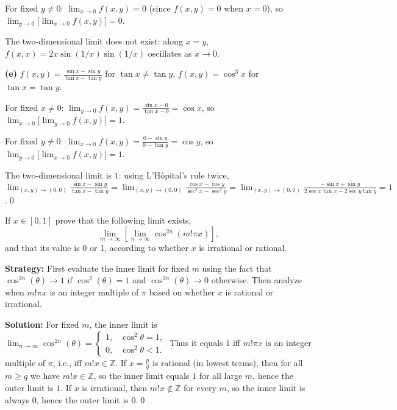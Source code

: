 For fixed $y\neq0$: $\lim_{x\to0}f(x,y)=0$ (since $f(x,y)=0$ when $x=0$), so $\lim_{y\to0}\big[\lim_{x\to0}f(x,y)\big]=0$.

The two-dimensional limit does not exist: along $x=y$, $f(x,x)=2x\sin(1/x)\sin(1/x)$ oscillates as $x\to0$.

\noindent\textbf{(e)} $f(x,y)=\frac{\sin x-\sin y}{\tan x-\tan y}$ for $\tan x\neq\tan y$, $f(x,y)=\cos^3x$ for $\tan x=\tan y$.

For fixed $x\neq0$: $\lim_{y\to0}f(x,y)=\frac{\sin x-0}{\tan x-0}=\cos x$, so $\lim_{x\to0}\big[\lim_{y\to0}f(x,y)\big]=1$.

For fixed $y\neq0$: $\lim_{x\to0}f(x,y)=\frac{0-\sin y}{0-\tan y}=\cos y$, so $\lim_{y\to0}\big[\lim_{x\to0}f(x,y)\big]=1$.

The two-dimensional limit is $1$: using L'Hôpital's rule twice, $\lim_{(x,y)\to(0,0)}\frac{\sin x-\sin y}{\tan x-\tan y}=\lim_{(x,y)\to(0,0)}\frac{\cos x-\cos y}{\sec^2x-\sec^2y}=\lim_{(x,y)\to(0,0)}\frac{-\sin x+\sin y}{2\sec x\tan x-2\sec y\tan y}=1$.\qed



\begin{problembox}
If \( x \in [0, 1] \) prove that the following limit exists,
\[\lim_{m \to \infty} \left[ \lim_{n \to \infty} \cos^{2n} (m! \pi x) \right],\]
and that its value is 0 or 1, according to whether \( x \) is irrational or rational.
\end{problembox}

\noindent\textbf{Strategy:} First evaluate the inner limit for fixed $m$ using the fact that $\cos^{2n}(\theta) \to 1$ if $\cos^2(\theta) = 1$ and $\cos^{2n}(\theta) \to 0$ otherwise. Then analyze when $m!\pi x$ is an integer multiple of $\pi$ based on whether $x$ is rational or irrational.

\bigskip\noindent\textbf{Solution:}
For fixed $m$, the inner limit is $\lim_{n\to\infty}\cos^{2n}(\theta)=\begin{cases}1,& \cos^2\theta=1,\\ 0,& \cos^2\theta<1.\end{cases}$ Thus it equals $1$ iff $m!\pi x$ is an integer multiple of $\pi$, i.e., iff $m!x\in\mathbb{Z}$. If $x=\tfrac{p}{q}$ is rational (in lowest terms), then for all $m\ge q$ we have $m!x\in\mathbb{Z}$, so the inner limit equals $1$ for all large $m$, hence the outer limit is $1$. If $x$ is irrational, then $m!x\notin\mathbb{Z}$ for every $m$, so the inner limit is always $0$, hence the outer limit is $0$.\qed

